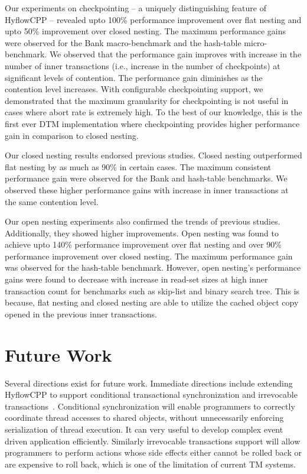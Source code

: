 \documentclass[12pt,english]{report}
\begin{document}
Our experiments on checkpointing -- a uniquely distinguishing feature of HyflowCPP -- revealed upto 100\% performance improvement over flat nesting and upto 50\% improvement over closed nesting. The maximum performance gains were observed for the Bank macro-benchmark and the hash-table micro-benchmark. We observed that the performance gain improves with increase in the number of inner transactions (i.e.,  increase in the number of checkpoints) at significant levels of contention. 
The performance gain diminishes as the contention level increases. With configurable checkpointing support, we demonstrated that the maximum granularity for checkpointing is not useful in cases where abort rate is extremely high. To the best of our knowledge, this is the first ever DTM implementation where checkpointing provides higher performance gain in comparison to closed nesting. 

Our closed nesting results endorsed previous studies. Closed nesting outperformed flat nesting by as much as 90\% in certain cases. The maximum consistent performance gain were observed for the Bank and hash-table benchmarks. We observed these higher performance gains with increase in inner transactions at the same contention level.

Our open nesting experiments also confirmed the trends of previous studies. Additionally, they showed higher improvements. Open nesting was found to achieve upto 140\% performance improvement over flat nesting and over 90\% performance improvement over closed nesting. The maximum performance gain was observed for the hash-table benchmark. 
However, open nesting's performance gains were found to decrease with increase in read-set sizes at high inner transaction count for benchmarks such as skip-list and binary search tree. 
This is because, flat nesting and closed nesting are able to utilize the cached object copy opened in the previous inner transactions. 

\section{Future Work}

Several directions exist for future work. Immediate directions include extending HyflowCPP to support conditional transactional synchronization and irrevocable transactions~\cite{welc2008irrevocable}. Conditional synchronization will enable programmers to correctly coordinate thread accesses to shared objects, without unnecessarily enforcing serialization of thread execution. It can very useful to develop complex event driven application efficiently. Similarly irrevocable transactions support will allow programmers to perform actions whose side effects either cannot be rolled back or are expensive to roll back, which is one of the limitation of current TM systems.
\end{document}
